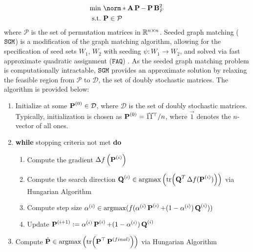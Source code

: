 \begin{align}
    \min & 
    ~\norm*{\A\Pbf - \Pbf\B}_F^2
    \label{eq:GMP}\\
    \mbox{s.t.} & {~\Pbf  \in \mathcal{P}} \nonumber
\end{align}
where $\mathcal{P}$ is the set of permutation matrices in $\mathbb{R}^{n \times n}$.
Seeded graph matching ($\operatorname{\mathtt{SGM}}$) is a modification of the graph matching algorithm, allowing for the specification of seed sets $W_1$, $W_2$ with seeding $\psi : W_1 \rightarrow W_2$, and solved via fast approximate quadratic assignment ($\mathtt{FAQ}$) \cite{vogelstein2015fast}.
As the seeded graph matching problem is computationally intractable, $\operatorname{\mathtt{SGM}}$ provides an approximate solution by relaxing the feasible region from $\mathcal{P}$ to $\mathcal{D}$, the set of doubly stochastic matrices. The algorithm is provided below:
\begin{enumerate}
    \item Initialize at some $\operatorname{\mathbf{P}}^{(0)} \in \mathcal{D}$, where $\mathcal{D}$ is the set of doubly stochastic matrices. Typically, initialization is chosen as $\operatorname{\mathbf{P}}^{(0)} = \vec{1}\vec{1}^\top / n$, where $\vec{1}$ denotes the $n$-vector of all ones.
    \item \textbf{while} stopping criteria not met \textbf{do}
        \begin{enumerate}
            \item Compute the gradient $\Delta f\left(\operatorname{\mathbf{P}}^{(i)}\right)$
            \item Compute the search direction $\Q^{(i)} \in \argmax{\left(\trace{\Q^{T} \Delta f(\Pbf^{\left(i\right)})}\right)}$ via Hungarian Algorithm
            \item  Compute step size $\alpha^{(i)} \in \argmax(f(\alpha^{(i)} \Pbf^{(i)} + (1 - \alpha^{(i)}) \Q^{(i)})) $
            \item Update $\operatorname{\mathbf{P}}^{(i+1)} := \alpha^{(i)} \operatorname{\mathbf{P}}^{(i)} + (1 - \alpha^{(i)}) \operatorname{\mathbf{Q}}^{(i)}$
        \end{enumerate}
    \item Compute $\hat{\Pbf} \in \argmax\left(\trace{\Pbf^{\top} \Pbf^{(final)}}\right)$ via Hungarian Algorithm
\end{enumerate} 
